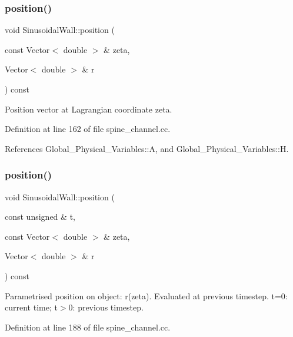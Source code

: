 \subsubsection{\texorpdfstring{position()}{position()}\hspace{0.1cm}{\footnotesize\ttfamily [1/2]}}
{\footnotesize\ttfamily void Sinusoidal\+Wall\+::position (\begin{DoxyParamCaption}\item[{const Vector$<$ double $>$ \&}]{zeta,  }\item[{Vector$<$ double $>$ \&}]{r }\end{DoxyParamCaption}) const\hspace{0.3cm}{\ttfamily [inline]}}



Position vector at Lagrangian coordinate zeta. 



Definition at line 162 of file spine\+\_\+channel.\+cc.



References Global\+\_\+\+Physical\+\_\+\+Variables\+::A, and Global\+\_\+\+Physical\+\_\+\+Variables\+::H.

\mbox{\label{classSinusoidalWall_afe74256b6e259c0c939a839db13a40cd}} 
\subsubsection{\texorpdfstring{position()}{position()}\hspace{0.1cm}{\footnotesize\ttfamily [2/2]}}
{\footnotesize\ttfamily void Sinusoidal\+Wall\+::position (\begin{DoxyParamCaption}\item[{const unsigned \&}]{t,  }\item[{const Vector$<$ double $>$ \&}]{zeta,  }\item[{Vector$<$ double $>$ \&}]{r }\end{DoxyParamCaption}) const\hspace{0.3cm}{\ttfamily [inline]}}



Parametrised position on object\+: r(zeta). Evaluated at previous timestep. t=0\+: current time; t$>$0\+: previous timestep. 



Definition at line 188 of file spine\+\_\+channel.\+cc.



